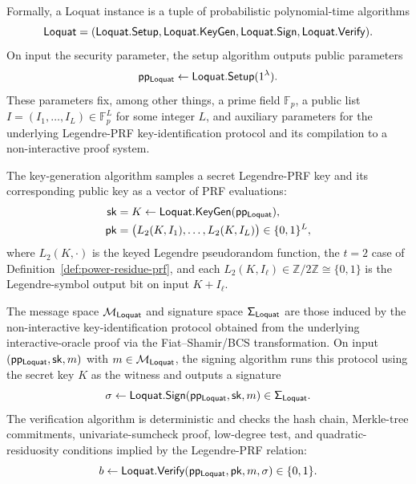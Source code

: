Formally, a Loquat instance is a tuple of probabilistic polynomial-time algorithms
\begin{equation*}
  \mathsf{Loquat} = (\mathsf{Loquat}.\mathsf{Setup},\mathsf{Loquat}.\mathsf{KeyGen},\mathsf{Loquat}.\mathsf{Sign},\mathsf{Loquat}.\mathsf{Verify}).
\end{equation*}
On input the security parameter, the setup algorithm outputs public parameters
\begin{equation*}
  \mathsf{pp_{Loquat}} \leftarrow \mathsf{Loquat}.\mathsf{Setup}(1^\lambda).
\end{equation*}
These parameters fix, among other things, a prime field \(\mathbb{F}_p\), a public list \(I = (I_1,\ldots,I_L) \in \mathbb{F}_p^L\) for some integer \(L\), and auxiliary parameters for the underlying Legendre-PRF key-identification protocol and its compilation to a non-interactive proof system.

The key-generation algorithm samples a secret Legendre-PRF key and its corresponding public key as a vector of PRF evaluations:
\begin{equation*}
  \begin{aligned}
    \mathsf{sk} &= K \leftarrow \mathsf{Loquat}.\mathsf{KeyGen}(\mathsf{pp_{Loquat}}),
    \\
    \mathsf{pk} &= \bigl(L_2(K,I_1),\ldots,L_2(K,I_L)\bigr) \in \{0,1\}^L,
  \end{aligned}
\end{equation*}
where \(L_2(K,\cdot)\) is the keyed Legendre pseudorandom function, the \(t=2\) case of Definition~\ref{def:power-residue-prf}, and each \(L_2(K,I_\ell) \in \mathbb{Z}/2\mathbb{Z}\cong\{0,1\}\) is the Legendre-symbol output bit on input \(K + I_\ell\).

The message space \(\mathsf{\mathcal{M}_{Loquat}}\) and signature space \(\mathsf{\Sigma_{Loquat}}\) are those induced by the non-interactive key-identification protocol obtained from the underlying interactive-oracle proof via the Fiat–Shamir/BCS transformation. On input \((\mathsf{pp_{Loquat}},\mathsf{sk},m)\) with \(m \in \mathsf{\mathcal{M}_{Loquat}}\), the signing algorithm runs this protocol using the secret key \(K\) as the witness and outputs a signature
\begin{equation*}
  \sigma \leftarrow \mathsf{Loquat}.\mathsf{Sign}(\mathsf{pp_{Loquat}},\mathsf{sk},m) \in \mathsf{\Sigma_{Loquat}}.
\end{equation*}
The verification algorithm is deterministic and checks the hash chain, Merkle-tree commitments, univariate-sumcheck proof, low-degree test, and quadratic-residuosity conditions implied by the Legendre-PRF relation:
\begin{equation*}
  b \leftarrow \mathsf{Loquat}.\mathsf{Verify}(\mathsf{pp_{Loquat}},\mathsf{pk},m,\sigma) \in \{0,1\}.
\end{equation*}

